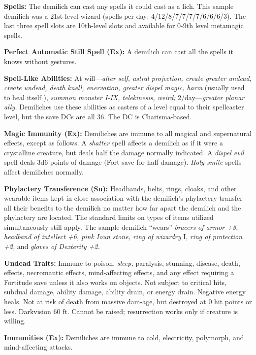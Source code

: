 \documentclass{article}
\begin{document}
\textbf{Spells: }The demilich can cast any spells it could cast as a lich. This 
sample demilich was a 21st-level wizard (spells per day: 4/12/8/7/7/7/7/6/6/6/3). 
The last three spell slots are 10th-level slots and available for 0-9th level metamagic 
spells. 

\textbf{Perfect Automatic Still Spell (Ex): }A demilich can cast all the spells 
it knows without gestures. 

\textbf{Spell-Like Abilities:} At will---\textit{alter self, astral projection, 
create greater undead, create undead, death knell, enervation, greater dispel magic, 
harm }(usually used to heal itself ), \textit{summon monster I-IX, telekinesis, 
weird; }2/day---\textit{greater planar ally. }Demiliches use these abilities as 
casters of a level equal to their spellcaster level, but the save DCs are all 36. 
The DC is Charisma-based.

\textbf{Magic Immunity (Ex):} Demiliches are immune to all magical and supernatural 
effects, except as follows. A \textit{shatter }spell affects a demilich as if it 
were a crystalline creature, but deals half the damage normally indicated. A \textit{dispel 
evil }spell deals 3d6 points of damage (Fort save for half damage). \textit{Holy 
smite }spells affect demiliches normally. 

\textbf{Phylactery Transference (Su): }Headbands, belts, rings, cloaks, and other 
wearable items kept in close association with the demilich's phylactery transfer 
all their benefits to the demilich no matter how far apart the demilich and the 
phylactery are located. The standard limits on types of items utilized simultaneously 
still apply. The sample demilich ``wears'' \textit{bracers of armor +8, headband 
of intellect +6, pink Ioun stone, ring of wizardry }I, \textit{ring of protection 
+2, }and \textit{gloves of Dexterity +2. }

\textbf{Undead Traits:} Immune to poison, \textit{sleep, }paralysis, stunning, 
disease, death, effects, necromantic effects, mind-affecting effects, and any effect 
requiring a Fortitude save unless it also works on objects. Not subject to critical 
hits, subdual damage, ability damage, ability drain, or energy drain. Negative 
energy heals. Not at risk of death from massive dam-age, but destroyed at 0 hit 
points or less. Darkvision 60 ft. Cannot be raised; resurrection works only if 
creature is willing. 

\textbf{Immunities (Ex):} Demiliches are immune to cold, electricity, polymorph, 
and mind-affecting attacks. 
\end{document}
